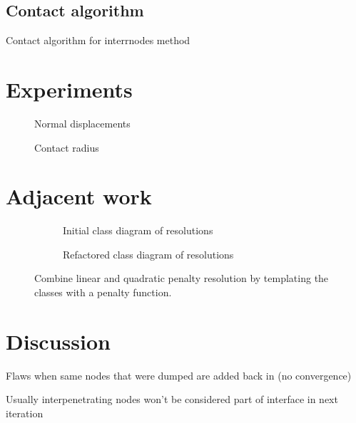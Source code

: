 \documentclass[11pt, a4paper]{article}
\begin{document}
\subsection{Contact algorithm}
\label{subsec:contact-algorithm}

\begin{algorithm}
    \caption{Contact algorithm for interrnodes method}
    
    \label{alg:internodes}
\end{algorithm}


\section{Experiments}
\label{sec:experiments}

\begin{figure}[ht]
   \centering
    
    \caption{Normal displacements}
    \label{fig:normal-displacements}
\end{figure}

\begin{figure}[ht]
    \centering
     
     \caption{Contact radius}
     \label{fig:contact-radius}
\end{figure}

\section{Adjacent work}
\label{sec:adjacent}

\begin{figure}[ht]
    \centering
    \begin{subfigure}[b]{.49\linewidth}
        \centering
        
        \caption{Initial class diagram of resolutions}\label{fig:resolution-initial}
    \end{subfigure}
    \begin{subfigure}[b]{.49\linewidth}
        \centering
        
        \caption{Refactored class diagram of resolutions}\label{fig:resolution-refactor}
    \end{subfigure}
    \caption{Combine linear and quadratic penalty resolution by templating the classes
    with a penalty function.}
    \label{fig:resolution}
\end{figure}

\section{Discussion}
\label{sec:discussion}

Flaws when same nodes that were dumped are added back in (no convergence) 

Usually interpenetrating nodes won't be considered part of interface in next iteration


\end{document}
